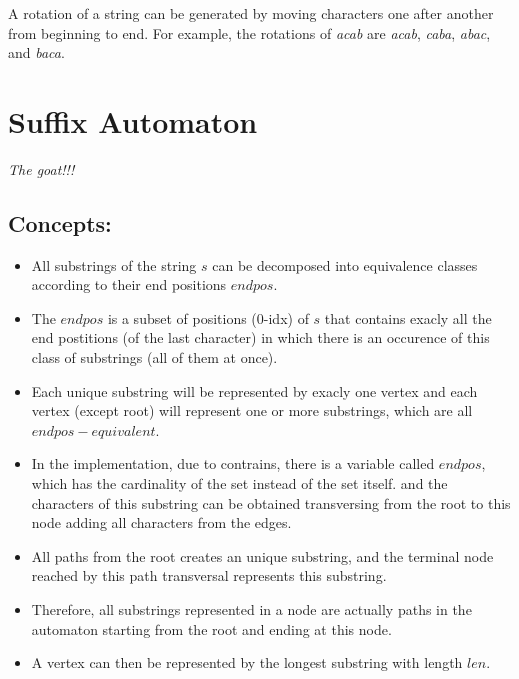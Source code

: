     A rotation of a string can be generated by moving characters one after another from beginning to end.
    For example, the rotations of \textit{acab} are \textit{acab}, \textit{caba}, \textit{abac}, and \textit{baca}.


\section{Suffix Automaton}

    \textit{The goat!!!} 

    \subsection{Concepts:}

    \begin{itemize}

        \item All substrings of the string $s$ can be decomposed into equivalence classes according to their end positions $endpos$.

        \item The $endpos$ is a subset of positions (0-idx) of $s$ that contains exacly all the end postitions (of the last character)
        in which there is an occurence of this class of substrings (all of them at once).

        \item Each unique substring will be represented by exacly one vertex and each vertex (except root) 
        will represent one or more substrings, which are all $endpos-equivalent$.

        \item In the implementation, due to contrains, there is a variable called $endpos$, which has the cardinality of the set instead of the set itself.
        and the characters of this substring can be obtained transversing from the root to this node adding all characters from the edges.

        \item All paths from the root creates an unique substring, and the terminal node reached by this path transversal represents this substring.

        \item Therefore, all substrings represented in a node are actually paths in the automaton starting from the root and ending at this node.

        \item A vertex can then be represented by the longest substring with length $len$.


\end{itemize}
